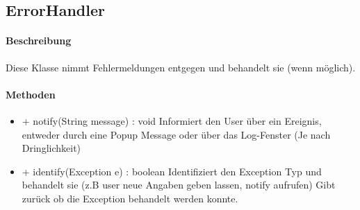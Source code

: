 \subsection{ErrorHandler}

\paragraph{Beschreibung}
Diese Klasse nimmt Fehlermeldungen entgegen und behandelt sie (wenn möglich).


\paragraph{Methoden}

\begin{itemize}
\item + notify(String message) : void
Informiert den User über ein Ereignis, entweder durch eine Popup Message oder über das Log-Fenster (Je nach Dringlichkeit)

\item + identify(Exception e) : boolean
Identifiziert den Exception Typ und behandelt sie (z.B user neue Angaben geben lassen, notify aufrufen)
Gibt zurück ob die Exception behandelt werden konnte.

\end{itemize}
